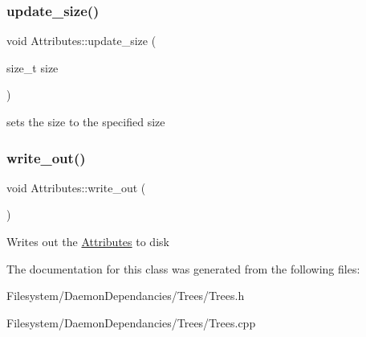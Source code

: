 \subsubsection{\texorpdfstring{update\+\_\+size()}{update\_size()}}
{\footnotesize\ttfamily void Attributes\+::update\+\_\+size (\begin{DoxyParamCaption}\item[{size\+\_\+t}]{size }\end{DoxyParamCaption})}

sets the size to the specified size \mbox{\label{classAttributes_a7066f30d97317f75a02a137d09a2065e}} 
\subsubsection{\texorpdfstring{write\+\_\+out()}{write\_out()}}
{\footnotesize\ttfamily void Attributes\+::write\+\_\+out (\begin{DoxyParamCaption}{ }\end{DoxyParamCaption})}

Writes out the \mbox{\hyperlink{classAttributes}{Attributes}} to disk 

The documentation for this class was generated from the following files\+:\begin{DoxyCompactItemize}
\item 
Filesystem/\+Daemon\+Dependancies/\+Trees/Trees.\+h\item 
Filesystem/\+Daemon\+Dependancies/\+Trees/Trees.\+cpp\end{DoxyCompactItemize}
